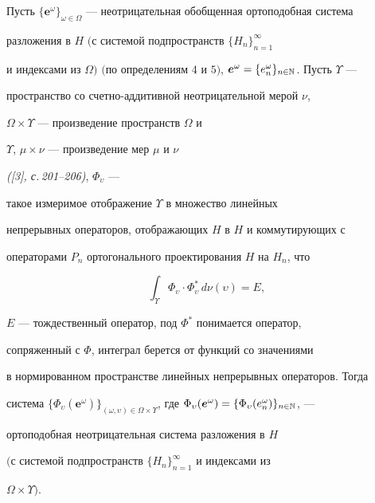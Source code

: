 \begin{thm}\hspace{-1.8mm}{\bf.}


Пусть $\{\boldsymbol e^\omega\}_{\omega\in


\Omega}$ --- неотрицательная обобщенная ортоподобная система


разложения в $H$ $($с системой подпространств $\{H_n\}_{n=1}^\infty$


и индексами из $\Omega)$ $($по определениям $4$ и $5)$, $\boldsymbol


e^\omega=\{e^\omega_n\}_{n\in\Bbb N}$. Пусть $\Upsilon$ ---


пространство со счетно-аддитивной неотрицательной мерой $\nu$,


$\Omega\times\Upsilon$ --- произведение пространств $\Omega$ и


$\Upsilon$, $\mu\times\nu$ --- произведение мер $\mu$ и $\nu$


{\em ([3], с.\,201--206)}, $\Phi_\upsilon$ ---


такое измеримое отображение $\Upsilon$ в множество линейных


непрерывных операторов, отображающих $H$ в $H$ и коммутирующих с


операторами $P_n$ ортогонального проектирования $H$ на $H_n$, что


\begin{equation}


\int_{\Upsilon}\Phi_\upsilon\cdot\Phi_\upsilon^*\,d\nu(\upsilon)=E,


\end{equation}


$E$ --- тождественный оператор, под $\Phi^*$ понимается оператор,


сопряженный с $\Phi$, интеграл берется от функций со значениями


в нормированном пространстве линейных непрерывных операторов. Тогда


система $\{\Phi_\upsilon(\boldsymbol e^\omega)\}_{(\omega


,\upsilon)\in\Omega\times\Upsilon}$, где $\Phi_\upsilon(\boldsymbol


e^\omega)=\{\Phi_\upsilon(e^\omega_n)\}_{n\in\Bbb N}$, ---


ортоподобная неотрицательная система разложения в $H$


$($с системой подпространств $\{H_n\}_{n=1}^\infty$ и индексами из


$\Omega\times\Upsilon)$.


\end{thm}





